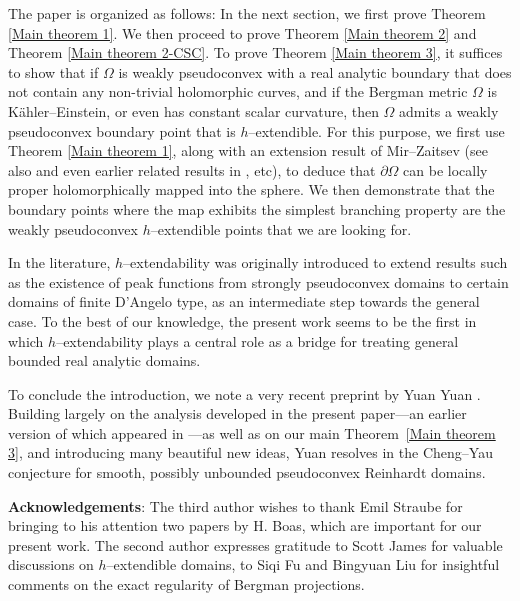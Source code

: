 \documentclass[a4paper,centertags,oneside,12pt]{amsart}
\numberwithin{equation}{section}
\begin{document}
The paper is organized as follows:
In the next section, we first prove Theorem \ref{Main theorem 1}. We then proceed to prove Theorem \ref{Main theorem 2} and Theorem \ref{Main theorem 2-CSC}. 
To prove Theorem \ref{Main theorem 3}, it suffices to show that if $\Omega$ is weakly pseudoconvex with a real analytic boundary that  does not contain any non-trivial holomorphic curves, and if the Bergman metric  $\Omega$ is K\"ahler--Einstein, or even has constant scalar curvature,  then $\Omega$ admits a weakly pseudoconvex boundary point that is $h$--extendible. For this purpose, we first use Theorem \ref{Main theorem 1}, along with an extension  result of Mir--Zaitsev \cite{MZ21} (see also \cite{MMZ03, LMR23} and even earlier related results in \cite{Fo92, Fo89}, etc),  to deduce that $\partial \Omega$ can be locally proper holomorphically  mapped into the sphere. We then demonstrate that the boundary points where the map exhibits the simplest branching property are the weakly pseudoconvex $h$--extendible points that we are looking for.

In the literature, $h$--extendability was originally introduced to extend results such as the existence of peak functions from strongly pseudoconvex domains to certain domains of finite D’Angelo type, as an intermediate step towards the general case. To the best of our knowledge, the present work seems to be  the first in which $h$--extendability plays a central role as a bridge for treating general bounded real analytic domains. 

To conclude the introduction, we note a very recent preprint by Yuan Yuan \cite{Yuan26}. Building largely   on the analysis developed in the present paper---an earlier version of which appeared in \cite{HHL26}---as well as on our main Theorem~\ref{Main theorem 3}, and introducing many beautiful new ideas, Yuan resolves in \cite{Yuan26} the Cheng--Yau conjecture for smooth, possibly unbounded pseudoconvex Reinhardt domains.

\medskip

{\bf Acknowledgements}: The third author wishes to thank Emil Straube for bringing to his attention two papers by H. Boas, which are important for our present work. The second author expresses gratitude to Scott James for valuable discussions on $h$--extendible domains, to Siqi Fu and Bingyuan Liu for insightful comments on the exact regularity of Bergman projections.
\end{document}
